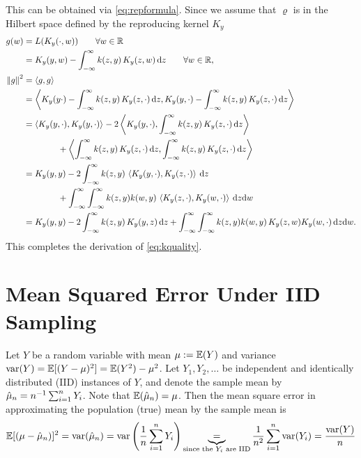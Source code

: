 \documentclass[letterpaper]{amsart}
\newcommand{\KY}{K_y}
\begin{document}
This can be obtained via \eqref{eq:repformula}.  Since we assume that $\varrho$ is in the Hilbert space defined by the reproducing kernel $\KY$
\begin{align*}
    g(w) &= L(\KY(\cdot,w)) \qquad \forall w \in \reals \\
    & = \KY(y,w) - \int_{-\infty}^{\infty} k(z,y) \, \KY(z,w) \, \dif z \qquad \forall w \in \reals, \\
    \norm{g}^2 &= \ip{g}{g} \\
    & = \ip{\KY(y\cdot) - \int_{-\infty}^{\infty} k(z,y) \, \KY(z,\cdot) \, \dif z}{\KY(y,\cdot) - \int_{-\infty}^{\infty} k(z,y) \, \KY(z,\cdot) \, \dif z} \\
    & = \ip{\KY(y,\cdot)}{\KY(y,\cdot)}
      - 2 \ip{\KY(y,\cdot)}{\int_{-\infty}^{\infty} k(z,y) \, \KY(z,\cdot) \, \dif z} \\
     & \qquad \qquad   + \ip{\int_{-\infty}^{\infty} k(z,y) \, \KY(z,\cdot) \, \dif z}{\int_{-\infty}^{\infty} k(z,y) \, \KY(z,\cdot) \, \dif z} \\
    & = \KY(y,y)
      - 2 \int_{-\infty}^{\infty} k(z,y) \, \ip{\KY(y,\cdot)}{\KY(z,\cdot)} \, \dif z \\
    & \qquad \qquad   + \int_{-\infty}^{\infty} \int_{-\infty}^{\infty} k(z,y) k(w,y) \, \ip{ \KY(z,\cdot)}{\KY(w,\cdot)} \,  \dif z\dif w \\
   & = \KY(y,y)
      - 2 \int_{-\infty}^{\infty} k(z,y) \, \KY(y,z) \, \dif z
     + \int_{-\infty}^{\infty} \int_{-\infty}^{\infty} k(z,y) k(w,y) \, \KY(z,w)\KY(w,\cdot) \,  \dif z\dif w.
\end{align*}
This completes the derivation of \eqref{eq:kquality}.

\section{Mean Squared Error Under IID Sampling} \label{app:MSE}
Let $Y$ be a random variable with mean $\mu :=  \operatorname{\mathbb{E}}(Y)$ and variance $\operatorname{var}(Y) = \operatorname{\mathbb{E}}[(Y - \mu)^2] = \operatorname{\mathbb{E}}(Y^2) - \mu^2$.  Let $Y_1, Y_2, \ldots$ be independent and identically distributed (IID) instances of $Y$, and denote the sample mean by $\hat{\mu}_n = n^{-1} \sum_{i=1}^n Y_i$.  Note that $\operatorname{\mathbb{E}}(\hat{\mu}_n) = \mu$.  Then the mean square error in approximating the population (true) mean by the sample mean is
\begin{equation*}
    \operatorname{\mathbb{E}}[(\mu - \hat{\mu}_n)]^2  =  \operatorname{var}(\hat{\mu}_n) = \operatorname{var} \left (\frac{1}{n} \sum_{i=1}^n Y_i \right) \underbrace{=}_{\text{since the $Y_i$ are IID}} \frac 1{n^2} \sum_{i=1}^n \operatorname{var}(Y_i) = \frac{\operatorname{var}(Y)}{n}
\end{equation*}
\end{document}
